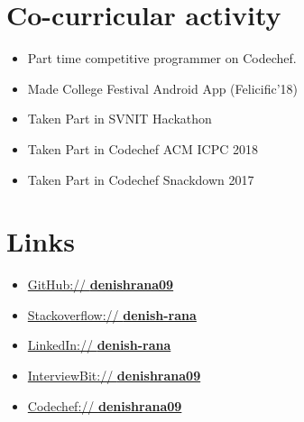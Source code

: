 \documentclass[11pt,a4paper,sans]{moderncv}        %
\begin{document}
\section{Co-curricular activity}

\vspace{6pt}

\begin{itemize}

\item{Part time competitive programmer on Codechef.}

\vspace{4pt}

\item{Made College Festival Android App (Felicific'18) }\vspace{6pt}

\item{Taken Part in SVNIT Hackathon  }\vspace{6pt}

\item{Taken Part in Codechef ACM ICPC 2018  }\vspace{6pt}

\item{Taken Part in Codechef Snackdown 2017 }\vspace{6pt}

\end{itemize}


\section{Links}

\vspace{6pt}
 
\begin{itemize}

\item{\href{https://github.com/denishrana09}{GitHub:// \textbf{denishrana09}}}\vspace{4pt}
\item \href{https://stackoverflow.com/users/8018480/denish-rana}{Stackoverflow:// \textbf{denish-rana}}\vspace{4pt}
\item \href{https://www.linkedin.com/in/denish-rana/}{LinkedIn:// \textbf{denish-rana}}\vspace{6pt}
\item \href{https://www.interviewbit.com/profile/denishrana09}{InterviewBit:// \textbf{denishrana09}}\vspace{6pt}
\item \href{https://www.codechef.com/users/denishrana09}{Codechef:// \textbf{denishrana09}}\vspace{4pt}

\end{itemize}

\nocite{*}

\end{document}
